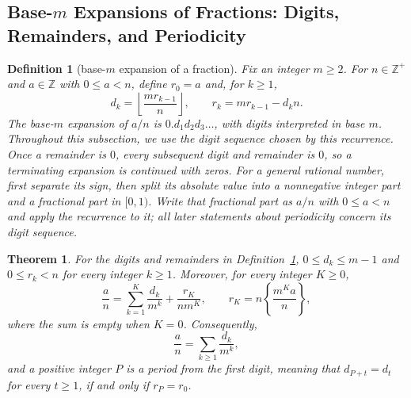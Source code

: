 \documentclass[11pt]{article}
\theoremstyle{ntstyle}
\newtheorem{theorem}{Theorem}[subsection]
\newtheorem{definition}{Definition}[subsection]
\begin{document}
\subsection{Base-\texorpdfstring{$m$}{m} Expansions of Fractions: Digits, Remainders, and Periodicity}

\begin{definition}[base-$m$ expansion of a fraction]\label{def:4.4.1} Fix an integer $m\ge2$. For $n\in\mathbb{Z}^+$ and $a\in\mathbb{Z}$ with $0\le a<n$, define $r_0=a$ and, for $k\ge1$,
	\[
		d_k=\left\lfloor\frac{m r_{k-1}}{n}\right\rfloor,\qquad r_k=m r_{k-1}-d_kn.
	\]
	The base-$m$ expansion of $a/n$ is $0.d_1d_2d_3\ldots$, with digits
	interpreted in base $m$. Throughout this subsection, we use the digit sequence
	chosen by this recurrence. Once a remainder is $0$, every subsequent digit
	and remainder is $0$, so a terminating expansion is continued with zeros.
	For a general rational number, first separate its sign, then split its
	absolute value into a nonnegative integer part and a fractional part in
	$[0,1)$. Write that fractional part as $a/n$ with $0\le a<n$ and apply the recurrence to it; all later statements
	about periodicity concern its digit sequence.
\end{definition}
\begin{theorem}\label{thm:4.4.1}
	For the digits and remainders in Definition~\ref{def:4.4.1},
	$0\le d_k\le m-1$ and $0\le r_k<n$ for every integer $k\ge1$.
	Moreover, for every integer $K\ge0$,
	\[
		\frac{a}{n}=\sum_{k=1}^{K}\frac{d_k}{m^k}
		+\frac{r_K}{nm^K},\qquad
		r_K=n\left\{\frac{m^Ka}{n}\right\},
	\]
	where the sum is empty when $K=0$. Consequently,
	\[
		\frac{a}{n}=\sum_{k\ge1}\frac{d_k}{m^k},
	\]
	and a positive integer $P$ is a period from the first digit, meaning that
	$d_{P+t}=d_t$ for every $t\ge1$, if and only if $r_P=r_0$.
\end{theorem}
\end{document}
